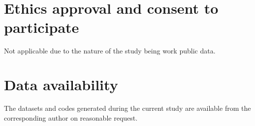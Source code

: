 \documentclass[12pt,a4paper]{article}
\theoremstyle{plain}
\theoremstyle{definition}
\theoremstyle{remark}
\begin{document}
\section*{Ethics approval and consent to participate}
Not applicable due to the nature of the study being work public data.

\section*{Data availability}
The datasets and codes generated during the current study are available from the corresponding author on reasonable
request.



\newpage


\end{document}
